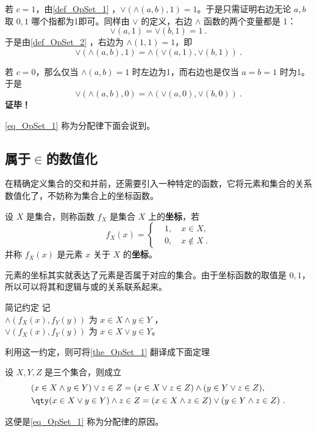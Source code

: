 若 $c=1$，由\autoref{def_OpSet_1} ，$\lor(\land(a,b),1)=1$。于是只需证明右边无论 $a,b$ 取 $0,1$ 哪个指都为1即可。同样由 $\lor$ 的定义，右边 $\land$ 函数的两个变量都是 1：
\begin{equation}
\lor(a,1)=\lor(b,1)=1~.
\end{equation}
于是由\autoref{def_OpSet_2} ，右边为 $\land(1,1)=1$，即
\begin{equation}
\lor(\land(a,b),1)=\land(\lor(a,1),\lor(b,1))~.
\end{equation}

若 $c=0$，那么仅当 $\land(a,b)=1$ 时左边为1，而右边也是仅当 $a=b=1$ 时为1。于是
\begin{equation}
\lor(\land(a,b),0)=\land(\lor(a,0),\lor(b,0))~.
\end{equation}
\textbf{证毕！}

\autoref{eq_OpSet_1} 称为分配律下面会说到。
\subsection{属于$\in$的数值化}
在精确定义集合的交和并前，还需要引入一种特定的函数，它将元素和集合的关系数值化了，不妨称为集合上的坐标函数。
\begin{definition}{}
设 $X$ 是集合，则称函数 $f_X$ 是集合 $X$ 上的\textbf{坐标}，若
\begin{equation}
f_X(x)=\left\{\begin{aligned}
&1,\quad x\in X,\\
&0,\quad x\notin X~.
\end{aligned}\right.
\end{equation}
并称 $f_X(x)$ 是元素 $x$ 关于 $X$ 的\textbf{坐标}。
\end{definition}
元素的坐标其实就表达了元素是否属于对应的集合。由于坐标函数的取值是 $0,1$，所以可以将其和逻辑与或的关系联系起来。

\begin{definition}{简记约定}
记\\
 $\land(f_X(x),f_Y(y))$ 为 $x\in X\land y\in Y$ ，\\
$\lor(f_X(x),f_Y(y))$ 为 $x\in X\lor y\in Y$。
\end{definition}

利用这一约定，则可将\autoref{the_OpSet_1} 翻译成下面定理
\begin{theorem}{}
设 $X,Y,Z$ 是三个集合，则成立
\begin{equation}
\begin{aligned}
&(x\in X\land y\in Y)\lor z\in Z=(x\in X\lor z\in Z)\land(y\in Y\lor z\in Z),\\
&\qty(x\in X\lor y\in Y)\land z\in Z=(x\in X\land z\in Z)\lor(y\in Y\land z\in Z)~.
\end{aligned}
\end{equation}
\end{theorem}
这便是\autoref{eq_OpSet_1} 称为分配律的原因。

